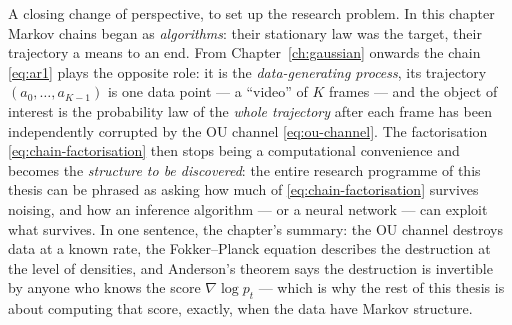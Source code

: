 A closing change of perspective, to set up the research problem. In this
chapter Markov chains began as \emph{algorithms}: their stationary law was
the target, their trajectory a means to an end. From
Chapter~\ref{ch:gaussian} onwards the chain \eqref{eq:ar1} plays the
opposite role: it is the \emph{data-generating process}, its trajectory
$(a_0, \dots, a_{K-1})$ is one data point --- a ``video'' of $K$ frames ---
and the object of interest is the probability law of the \emph{whole
trajectory} after each frame has been independently corrupted by the OU
channel \eqref{eq:ou-channel}. The factorisation
\eqref{eq:chain-factorisation} then stops being a computational convenience
and becomes the \emph{structure to be discovered}: the entire research
programme of this thesis can be phrased as asking how much of
\eqref{eq:chain-factorisation} survives noising, and how an inference
algorithm --- or a neural network --- can exploit what survives. In one
sentence, the chapter's summary: the OU channel destroys data at a known
rate, the Fokker--Planck equation describes the destruction at the level of
densities, and Anderson's theorem says the destruction is invertible by
anyone who knows the score $\nabla \log p_t$ --- which is why the rest of
this thesis is about computing that score, exactly, when the data have
Markov structure.
